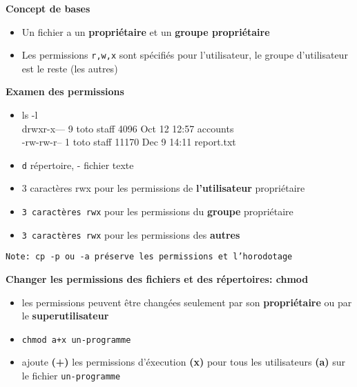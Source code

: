 \documentclass[french]{beamer}
\begin{document}
\begin{frame}
\textbf{Concept de bases}
\begin{itemize}
\item Un fichier a un \textbf{propriétaire} et un \textbf{groupe propriétaire}
\item Les permissions \texttt{r,w,x} sont spécifiés pour l'utilisateur, le
groupe d'utilisateur est le reste (les autres)
\end{itemize}
\end{frame}

\begin{frame}
\textbf{Examen des permissions}
\begin{itemize}
\item ls -l \\
drwxr-x--- 9 toto staff  4096 Oct 12 12:57 accounts \\
-rw-rw-r-- 1 toto staff 11170 Dec 9 14:11 report.txt
\item \texttt{d} répertoire, {-} fichier texte
\item 3 caractères rwx pour les permissions de \textbf{l'utilisateur}
propriétaire
\item \texttt{3 caractères rwx} pour les permissions du \textbf{groupe}
propriétaire
\item \texttt{3 caractères rwx} pour les permissions des \textbf{autres}
\end{itemize}
\texttt{Note: cp -p ou -a préserve les permissions et l'horodotage}
\end{frame}

\begin{frame}
\textbf{Changer les permissions des fichiers et des répertoires: chmod }
\begin{itemize}
\item les permissions peuvent être changées seulement par son \textbf{propriétaire} ou par le \textbf{superutilisateur}
\item \texttt{chmod a+x un-programme}
\item ajoute \textbf{(+)} les permissions d'éxecution \textbf{(x)} pour tous les
utilisateurs \textbf{(a)} sur le fichier \texttt{un-programme}
\end{itemize}
\end{frame}
\end{document}
